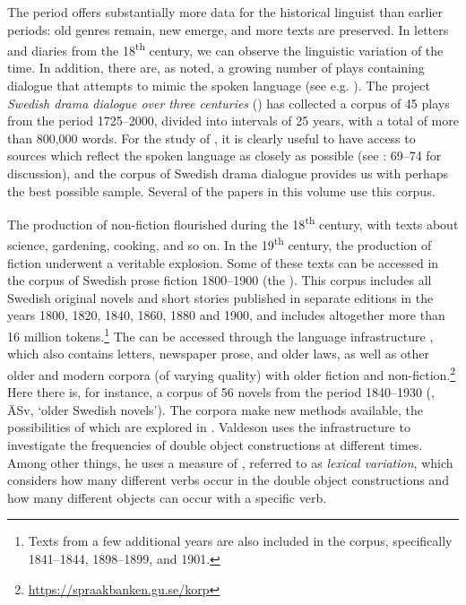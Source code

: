 \documentclass[output=paper]{langscibook}
\begin{document}
The  period offers substantially more data for the historical linguist than earlier periods: old genres remain, new emerge, and more texts are preserved. In letters and diaries from the 18\textsuperscript{th} century, we can observe the linguistic variation of the time. In addition, there are, as noted, a growing number of plays containing dialogue that attempts to mimic the spoken language (see e.g. \citealt{Widmark1970,Widmark2000,Thelander2007}). The project \textit{Swedish drama dialogue over three centuries} (\citealt{MarttalaStromquist2001}) has collected a corpus of 45 plays from the period 1725–2000, divided into intervals of 25 years, with a total of more than 800,000 words. For the study of , it is clearly useful to have access to sources which reflect the spoken language as closely as possible (see \citealt{Magnusson2007}: 69–74 for discussion), and the corpus of Swedish drama dialogue provides us with perhaps the best possible sample. Several of the papers in this volume use this corpus.



The production of non-fiction flourished during the 18\textsuperscript{th} century, with texts about science, gardening, cooking, and so on. In the 19\textsuperscript{th} century, the production of fiction underwent a veritable explosion. Some of these texts can be accessed in the corpus of Swedish prose fiction 1800–1900 (the ). This corpus includes all Swedish original novels and short stories published in separate editions in the years 1800, 1820, 1840, 1860, 1880 and 1900, and includes altogether more than 16 million tokens.\footnote{Texts from a few additional years are also included in the corpus, specifically 1841–1844, 1898–1899, and 1901.}  The  can be accessed through the language infrastructure  \citep{BorinEtAl2012}, which also contains letters, newspaper prose, and older laws, as well as other older and modern corpora (of varying quality) with older fiction and non-fiction.\footnote{\url{https://spraakbanken.gu.se/korp}}  Here there is, for instance, a corpus of 56 novels from the period 1840–1930 (, ÄSv, ‘older Swedish novels’). The corpora make new methods available, the possibilities of which are explored in . Valdeson uses the  infrastructure to investigate the frequencies of double object constructions at different times. Among other things, he uses a measure of , referred to as \textit{lexical variation}, which considers how many different verbs occur in the double object constructions and how many different objects can occur with a specific verb.
\end{document}
